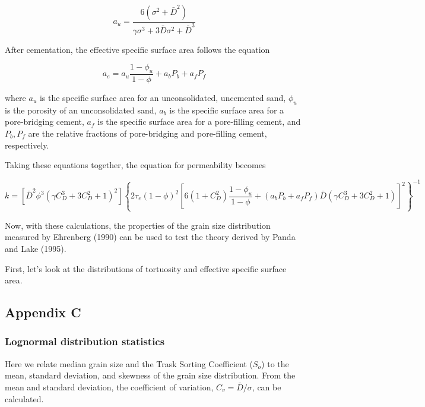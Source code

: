 \documentclass[]{article}
\begin{document}
\begin{equation}
a_u = \frac{6(\sigma^2 + \bar{D}^2)}{\gamma \sigma^3 + 3\bar{D}\sigma^2 + \bar{D}^3}
\end{equation}

After cementation, the effective specific surface area follows the
equation

\begin{equation}
a_e = a_u \frac{1-\phi_u}{1-\phi} + a_b P_b + a_f P_f
\end{equation}

where \(a_u\) is the specific surface area for an unconsolidated,
uncemented sand, \(\phi_u\) is the porosity of an unconsolidated sand,
\(a_b\) is the specific surface area for a pore-bridging cement, \(a_f\)
is the specific surface area for a pore-filling cement, and \(P_b,P_f\)
are the relative fractions of pore-bridging and pore-filling cement,
respectively.

Taking these equations together, the equation for permeability becomes

\begin{equation}
k = \left[\bar{D}^2 \phi^3 \left(\gamma C_D^3 + 3C_D^2 + 1 \right)^2 \right]
 \left\{ 2\tau_e (1-\phi)^2 \left[ 6\left(1+C_D^2 \right) \frac{1-\phi_u}{1-\phi} + 
 \left(a_b P_b + a_f P_f \right) \bar{D} \left(\gamma C_D^3 + 3C_D^2 +1 \right) \right]^2\right\}^{-1}
\end{equation}

Now, with these calculations, the properties of the grain size
distribution measured by Ehrenberg (1990) can be used to test the theory
derived by Panda and Lake (1995).

First, let's look at the distributions of tortuosity and effective
specific surface area.

\subsection{Appendix C}\label{appendix-c}

\subsubsection{Lognormal distribution
statistics}\label{lognormal-distribution-statistics}

Here we relate median grain size and the Trask Sorting Coefficient
(\(S_o\)) to the mean, standard deviation, and skewness of the grain
size distribution. From the mean and standard deviation, the coefficient
of variation, \(C_v = \bar{D}/\sigma\), can be calculated.
\end{document}
